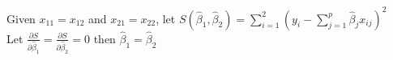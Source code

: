 \documentclass[10pt]{article}
\begin{document}
Given $x_{11}=x_{12}$ and $x_{21}=x_{22}$, let $S(\hat{\beta}_1, \hat{\beta}_2) = \sum_{i=1}^2(y_i-\sum_{j=1}^p\hat{\beta}_j x_{ij})^2$ \\
Let $\frac{\partial S}{\partial \hat{\beta}_1}=\frac{\partial S}{\partial \hat{\beta}_2}=0$ then $\hat{\beta}_1 = \hat{\beta}_2$
\end{document}
